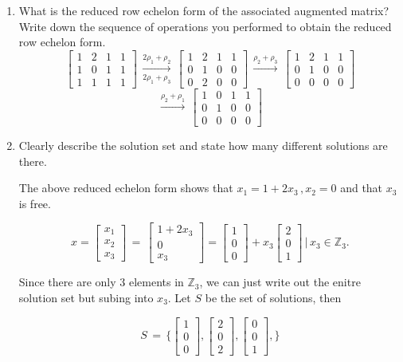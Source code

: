 \documentclass[11pt,table]{article}
\newcommand {\mat}  [1] {\left[\begin{array}{#1}}
\newcommand {\rix}      {\end{array}\right]}
\newcommand{\<}			{\langle}
\renewcommand{\>}      		{\rangle}
\newcommand{\bZ}		{\mathbb{Z}}
\begin{document}
\begin{enumerate}
\begin{enumerate}
	\item  What is the reduced row echelon form of the associated augmented matrix? Write down the sequence of operations you performed to obtain the reduced row echelon form. 
	\[ \mat{rrrr} 1 & 2 & 1 & 1 \\ 1 & 0 & 1 & 1 \\ 1 & 1 & 1 & 1 \rix \, \xrightarrow[2\rho_1 + \rho_3]{2\rho_1 + \rho_2} \, \mat{rrrr} 1 & 2 & 1 & 1 \\ 0 & 1 & 0 & 0 \\ 0 & 2 & 0 & 0 \rix \, \xrightarrow{\rho_2 + \rho_3} \, \mat{rrrr} 1 & 2 & 1 & 1 \\ 0 & 1 & 0 & 0 \\ 0 & 0 & 0 & 0 \rix \]
	\[ \, \xrightarrow{\rho_2 + \rho_1} \, \mat{rrrr} 1 & 0 & 1 & 1 \\ 0 & 1 & 0 & 0 \\ 0 & 0 & 0 & 0 \rix \,\]


	\item Clearly describe the solution set and state how many different solutions are there. 
	
	The above reduced echelon form shows that $x_1 = 1 + 2x_3 \, , x_2 = 0$ and that $x_3$ is free. 
		 
	\[ x = \mat{r} x_1 \\ x_2 \\ x_3 \rix \, = \, \mat{r} 1 +  2x_3 \\ 0 \\ x_3 \rix  = \mat{r} 1 \\ 0 \\ 0 \rix + x_3 \mat{r} 2 \\ 0 \\ 1 \rix \, | \, x_3 \in \bZ_3. \] 
	
	 Since there are only $3$ elements in $\bZ_3$, we can just write out the enitre solution set but subing into $x_3$. Let $S$ be the set of solutions, then 

	 \[S \, = \, \Big\{ \mat{r} 1 \\ 0 \\ 0 \rix, \mat{r} 2 \\ 0 \\ 2 \rix,\mat{r} 0 \\ 0 \\ 1 \rix, \Big\}\]
\end{enumerate}

\end{enumerate}
\end{document}
